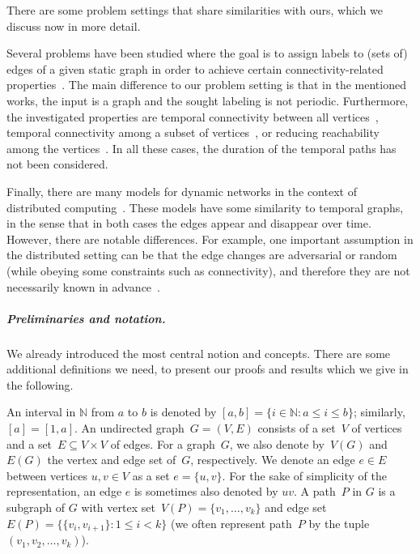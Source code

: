 \documentclass[a4paper,UKenglish,cleveref, autoref, thm-restate, anonymous]{lipics-v2021}
\begin{document}
There are some problem settings that share similarities with ours, which we discuss now in more detail.

Several problems have been studied where the goal is to assign labels to (sets of) edges of a given static graph in order to achieve certain connectivity-related properties~\cite{KlobasMMS22,MertziosMS19,akrida2017complexity,enright2021assigning}. The main difference to our problem setting is that in the mentioned works, the input is a graph and the sought labeling is not periodic. Furthermore, the investigated properties are temporal connectivity between all vertices~\cite{KlobasMMS22,MertziosMS19,akrida2017complexity}, temporal connectivity among a subset of vertices~\cite{KlobasMMS22}, or reducing reachability among the vertices~\cite{enright2021assigning}. In all these cases, the duration of the temporal paths has not been considered.




Finally, there are many models for dynamic networks in the context of distributed computing~\cite{Kuhn2011Dynamic}. 
These models have some similarity to temporal graphs, in the sense that in both cases the edges appear and disappear over time. 
However, there are notable differences. For example, one important assumption in the distributed setting 
can be that the edge changes are adversarial or random (while obeying some constraints such as connectivity), 
and therefore they are not necessarily known in advance~\cite{Kuhn2011Dynamic}. 




\subparagraph{Preliminaries and notation.}
We already introduced the most central notion and concepts. There are some additional definitions we need, to present our proofs and results which we give in the following. 

An interval in $\mathbb N$ from $a$ to $b$ is denoted by $[a,b] = \{ i\in \mathbb N  :  a \leq i \leq b\}$; similarly, $[a] = [1,a]$.
An undirected graph~$G=(V,E)$ consists of a set~$V$ of vertices 
and a set~$E \subseteq V \times V$ of edges.
For a graph~$G$, we also denote by~$V(G)$ and~$E(G)$ the vertex and edge set of~$G$, respectively.
We denote an edge $e \in E$ between vertices $u,v \in V$ as a set $e=\{u,v\}$.
For the sake of simplicity of the representation, an edge $e$ is sometimes also denoted by $uv$. 
A path~$P$ in $G$ is a subgraph of $G$ with vertex set~$V(P)=\{v_1,\dots,v_k\}$ and edge set~$E(P)=\{\{v_i,v_{i+1}\} :  1\leq i<k\}$
(we often represent path~$P$ by the tuple~$(v_1,v_2,\dots,v_k)$).
\end{document}
